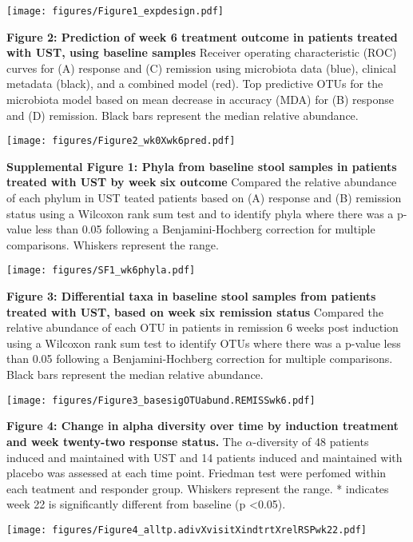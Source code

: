 \documentclass[12pt,]{article}
\begin{document}
\texttt{[image: figures/Figure1\_expdesign.pdf]}

\newpage

\textbf{Figure 2: Prediction of week 6 treatment outcome in patients
treated with UST, using baseline samples} Receiver operating
characteristic (ROC) curves for (A) response and (C) remission using
microbiota data (blue), clinical metadata (black), and a combined model
(red). Top predictive OTUs for the microbiota model based on mean
decrease in accuracy (MDA) for (B) response and (D) remission. Black
bars represent the median relative abundance.

\texttt{[image: figures/Figure2\_wk0Xwk6pred.pdf]}

\newpage

\textbf{Supplemental Figure 1: Phyla from baseline stool samples in
patients treated with UST by week six outcome} Compared the relative
abundance of each phylum in UST teated patients based on (A) response
and (B) remission status using a Wilcoxon rank sum test and to identify
phyla where there was a p-value less than 0.05 following a
Benjamini-Hochberg correction for multiple comparisons. Whiskers
represent the range.

\texttt{[image: figures/SF1\_wk6phyla.pdf]}

\newpage

\textbf{Figure 3: Differential taxa in baseline stool samples from
patients treated with UST, based on week six remission status} Compared
the relative abundance of each OTU in patients in remission 6 weeks post
induction using a Wilcoxon rank sum test to identify OTUs where there
was a p-value less than 0.05 following a Benjamini-Hochberg correction
for multiple comparisons. Black bars represent the median relative
abundance.

\texttt{[image: figures/Figure3\_basesigOTUabund.REMISSwk6.pdf]}

\newpage

\textbf{Figure 4: Change in alpha diversity over time by induction
treatment and week twenty-two response status.} The
\({\alpha}\)-diversity of 48 patients induced and maintained with UST
and 14 patients induced and maintained with placebo was assessed at each
time point. Friedman test were perfomed within each teatment and
responder group. Whiskers represent the range. * indicates week 22 is
significantly different from baseline (p \textless{}0.05).

\texttt{[image: figures/Figure4\_alltp.adivXvisitXindtrtXrelRSPwk22.pdf]}
\end{document}
